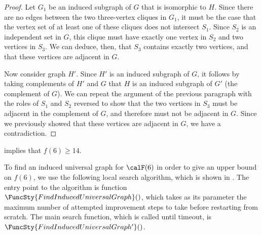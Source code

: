 \begin{proof}
    Let $G_1$ be an induced
    subgraph of $G$ that is isomorphic to $H$.  Since there are
    no edges between the two three-vertex cliques in $G_1$, it must be the case that the
    vertex set of at least one of these cliques does not intersect $S_1$.
    Since $S_2$ is an independent set in $G$, this clique must have exactly
    one vertex in $S_2$ and two vertices in $S_3$.  We can deduce, then, that
    $S_3$ contains exactly two vertices, and that these vertices are adjacent in $G$.

    Now consider graph $H'$.  Since $H'$ is an induced subgraph of $G$, it
    follows by taking complements of $H'$ and $G$ that $H$ is an induced
    subgraph of $G'$ (the complement of $G$).  We can repeat the argument
    of the previous paragraph with the roles of $S_1$ and $S_2$ reversed to
    show that the two vertices in $S_3$ must be adjacent in the complement of
    $G$, and therefore must not be adjacent in $G$.  Since we previously showed that
    these vertices are adjacent in $G$, we have a contradiction.
\end{proof}

 implies that $f(6) \geq 14$.

To find an induced universal graph for $\calF(6)$ in order to give an upper bound
on $f(6)$, we use the following local search
algorithm, which is shown in .
The entry point to the algorithm is function $\FuncSty{FindInducedUniversalGraph}()$,
which takes as its parameter the maximum number of attempted improvement steps to
take before restarting from scratch.  The main search function, which is called
until timeout, is $\FuncSty{FindInducedUniversalGraph'}()$.

